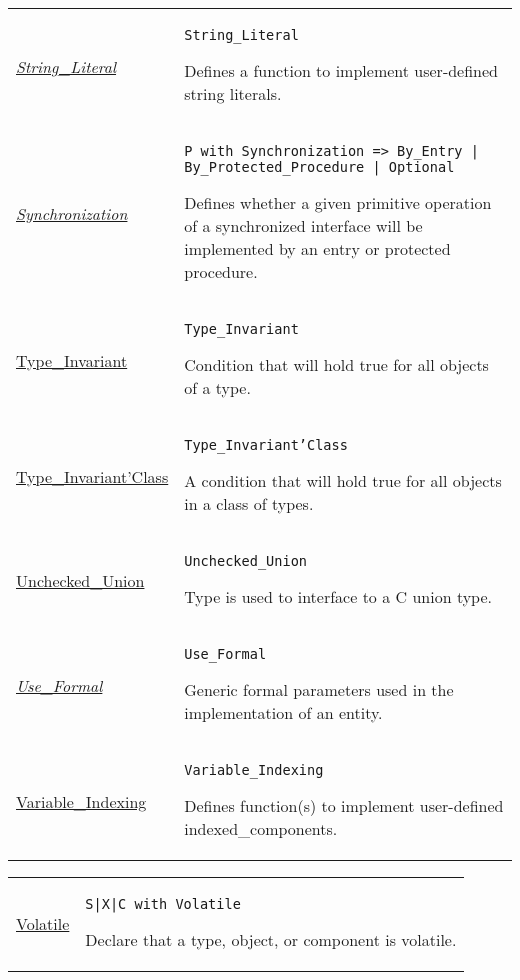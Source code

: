 \documentclass[english]{article}
\begin{document}
\begin{scriptsize}
\begin{multicols*}{3}
\begin{tabular}{@{}p{2cm}p{6.5cm}}
   \href{http://www.ada-auth.org/standards/22rm/html/RM-4-2-1.html}{\textit{String\_Literal}} & \texttt{String\_Literal}

   Defines a function to implement user-defined string literals.\\

   \href{http://www.ada-auth.org/standards/22rm/html/RM-9-5.html}{\textit{Synchronization}} & \texttt{P with Synchronization => By\_Entry | By\_Protected\_Procedure | Optional}

   Defines whether a given primitive operation of a synchronized interface will be implemented by an entry or protected procedure. \\

   \href{http://www.ada-auth.org/standards/22rm/html/RM-7-3-2.html}{Type\_Invariant} & \texttt{Type\_Invariant}

   Condition that will hold true for all objects of a type.\\

   \href{http://www.ada-auth.org/standards/22rm/html/RM-7-3-2.html}{Type\_Invariant'Class} & \texttt{Type\_Invariant'Class}

   A condition that will hold true for all objects in a class of types.\\

   \href{http://www.ada-auth.org/standards/22rm/html/RM-B-3-3.html}{Unchecked\_Union} & \texttt{Unchecked\_Union}

   Type is used to interface to a C union type.\\

   \href{http://www.ada-auth.org/standards/22rm/html/RM-H-7-1.html}{\textit{Use\_Formal}} & \texttt{Use\_Formal}

   Generic formal parameters used in the implementation of an entity.\\

   \href{http://www.ada-auth.org/standards/22rm/html/RM-4-1-6.html}{Variable\_Indexing} & \texttt{Variable\_Indexing}

   Defines function(s) to implement user-defined indexed\_components.\\

\end{tabular}
\begin{tabular}{@{}p{2cm}p{6.5cm}}

   \href{http://www.ada-auth.org/standards/22rm/html/RM-C-6.html}{Volatile} & \texttt{S|X|C with Volatile}

   Declare that a type, object, or component is volatile.\\


\end{tabular}
\end{multicols*}
\end{scriptsize}
\end{document}
